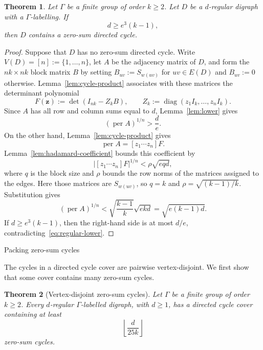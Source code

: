 \documentclass[11pt]{amsart}
\makeatletter
\def\section{\@startsection{section}{1}%
  \z@{1.5\linespacing\@plus.6\linespacing}{.65\linespacing}%
  {\normalfont\Large\bfseries\raggedright}}
\newtheorem{theorem}{Theorem}[section]
\theoremstyle{remark}
\newcommand{\per}{\operatorname{per}}
\newcommand{\diag}{\operatorname{diag}}
\makeatother
\begin{document}
\begin{theorem}\label{thm:main}
Let $\Gamma$ be a finite group of order $k\ge2$.  Let $D$ be a
$d$-regular digraph with a $\Gamma$-labelling.  If
\[
  d\ge e^3(k-1),
\]
then $D$ contains a zero-sum directed cycle.
\end{theorem}

\begin{proof}
Suppose that $D$ has no zero-sum directed cycle.  Write
$V(D)=[n]:=\{1,\ldots,n\}$, let $A$ be the adjacency matrix of $D$,
and form the $nk\times nk$ block matrix $B$ by setting
$B_{uv}:=S_{w(uv)}$ for $uv\in E(D)$ and $B_{uv}:=0$ otherwise.
Lemma~\ref{lem:cycle-product} associates with these matrices the
determinant polynomial
\[
  F(\mathbf z):=\det(I_{nk}-Z_kB),
  \qquad
  Z_k:=\diag(z_1I_k,\ldots,z_nI_k).
\]
Since $A$ has all row and column sums equal to $d$,
Lemma~\ref{lem:lower} gives
\begin{equation}\label{eq:regular-lower}
  (\per A)^{1/n}>\frac de.
\end{equation}
On the other hand, Lemma~\ref{lem:cycle-product} gives
\[
  \per A=[z_1\cdots z_n]F.
\]
Lemma~\ref{lem:hadamard-coefficient} bounds this coefficient by
\[
  \left|[z_1\cdots z_n]F\right|^{1/n}
  <\rho\sqrt{eqd},
\]
where $q$ is the block size and $\rho$ bounds the row norms of the
matrices assigned to the edges.  Here those matrices are
$S_{w(uv)}$, so $q=k$ and $\rho=\sqrt{(k-1)/k}$.  Substitution gives
\[
  (\per A)^{1/n}
  <
  \sqrt{\frac{k-1}{k}}\sqrt{ekd}
  =
  \sqrt{e(k-1)d}.
\]
If $d\ge e^3(k-1)$, then the right-hand side is at most $d/e$,
contradicting~\eqref{eq:regular-lower}.
\end{proof}

\section{Packing zero-sum cycles}\label{sec:packing}

The cycles in a directed cycle cover are pairwise vertex-disjoint.  We
first show that some cover contains many zero-sum cycles.

\begin{theorem}[Vertex-disjoint zero-sum cycles]
\label{thm:vertex-packing}
Let $\Gamma$ be a finite group of order $k\ge2$.  Every $d$-regular
$\Gamma$-labelled digraph, with $d\ge1$, has a directed cycle cover
containing at least
\[
  \left\lfloor\frac{d}{25k}\right\rfloor
\]
zero-sum cycles.
\end{theorem}
\end{document}
